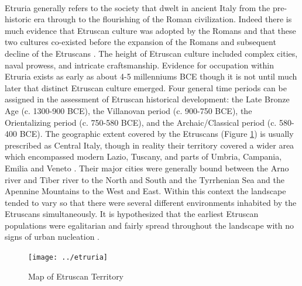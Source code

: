 \documentclass[12pt,a4paper]{thesis}
\begin{document}
\paragraph{}
Etruria generally refers to the society that dwelt in ancient Italy from the pre-historic era through to the flourishing of the Roman civilization. Indeed there is much evidence that Etruscan culture was adopted by the Romans and that  these two cultures co-existed before the expansion of the Romans and subsequent decline of the Etruscans \cite[30-32, 56-60]{Scu80}. The height of Etruscan culture included complex cities, naval prowess, and intricate craftsmanship. Evidence for occupation within Etruria exists as early as about 4-5 millenniums BCE though it is not until much later that  distinct Etruscan culture emerged. Four general time periods can be assigned in the assessment of Etruscan historical development: the Late Bronze Age (c. 1300-900 BCE), the Villanovan period (c. 900-750 BCE), the Orientalizing period (c. 750-580 BCE), and the Archaic/Classical period (c. 580-400 BCE). The geographic extent covered by the Etruscans (Figure \ref{fig:etruria}) is usually prescribed as Central Italy, though in reality their territory covered a wider area which encompassed modern Lazio, Tuscany, and parts of Umbria, Campania, Emilia and Veneto \cite[21, 38]{SpiSto92}. Their major cities were generally bound between the Arno river and Tiber river to the North and South and the Tyrrhenian Sea and the Apennine Mountains to the West and East. Within this context the landscape tended to vary so that there were several different environments inhabited by the Etruscans simultaneously. It is hypothesized that the earliest Etruscan populations were egalitarian and fairly spread throughout the landscape with no signs of urban nucleation \cite[44-46]{BarRas98}. 

\begin{figure}
\centering
\texttt{[image: ../etruria]}
\caption[Map of Etruscan Territory]{Map of Etruscan Territory}
\label{fig:etruria}
\end{figure}
\end{document}
